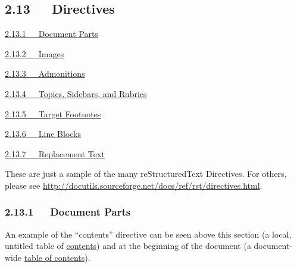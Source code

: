 \documentclass[10pt,english]{article}
\begin{document}

\hypertarget{directives}{}
\subsection*{2.13~~~Directives}
\begin{list}{}{}
\item {} \href{\#document-parts}{2.13.1~~~Document Parts}

\item {} \href{\#images}{2.13.2~~~Images}

\item {} \href{\#admonitions}{2.13.3~~~Admonitions}

\item {} \href{\#topics-sidebars-and-rubrics}{2.13.4~~~Topics, Sidebars, and Rubrics}

\item {} \href{\#target-footnotes}{2.13.5~~~Target Footnotes}

\item {} \href{\#line-blocks}{2.13.6~~~Line Blocks}

\item {} \href{\#replacement-text}{2.13.7~~~Replacement Text}

\end{list}


These are just a sample of the many reStructuredText Directives.  For
others, please see
\href{http://docutils.sourceforge.net/docs/ref/rst/directives.html}{http://docutils.sourceforge.net/docs/ref/rst/directives.html}.



\hypertarget{document-parts}{}
\subsubsection*{2.13.1~~~Document Parts}

An example of the ``contents'' directive can be seen above this section
(a local, untitled table of \href{\#contents}{contents}) and at the beginning of the
document (a document-wide \href{\#table-of-contents}{table of contents}).


\end{document}
